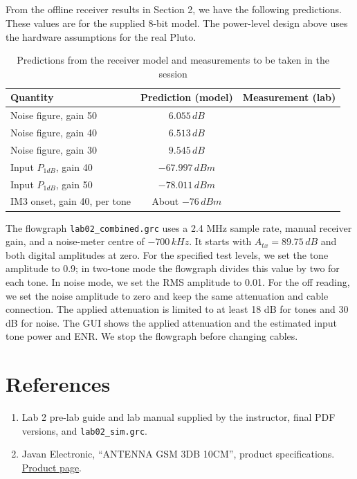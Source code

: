 \documentclass[]{article}
\begin{document}
    \subsection{}
    From the offline receiver results in Section 2, we have the following predictions. These values are for the supplied 8-bit model. The power-level design above uses the hardware assumptions for the real Pluto.

    \begin{table}[H]
    \centering\small
    \renewcommand{\arraystretch}{1.3}
    \begin{tabularx}{\linewidth}{|X|c|c|}
    \hline
    Quantity & Prediction (model) & Measurement (lab) \\ \hline
    Noise figure, gain 50 & $6.055\,dB$ & \\ \hline
    Noise figure, gain 40 & $6.513\,dB$ & \\ \hline
    Noise figure, gain 30 & $9.545\,dB$ & \\ \hline
    Input $P_{1dB}$, gain 40 & $-67.997\,dBm$ & \\ \hline
    Input $P_{1dB}$, gain 50 & $-78.011\,dBm$ & \\ \hline
    IM3 onset, gain 40, per tone & About $-76\,dBm$ & \\ \hline
    \end{tabularx}
    \caption{Predictions from the receiver model and measurements to be taken in the session}
    \end{table}

    The flowgraph \texttt{lab02\_combined.grc} uses a 2.4 MHz sample rate, manual receiver gain, and a noise-meter centre of $-700\,kHz$. It starts with $A_{tx}=89.75\,dB$ and both digital amplitudes at zero. For the specified test levels, we set the tone amplitude to 0.9; in two-tone mode the flowgraph divides this value by two for each tone. In noise mode, we set the RMS amplitude to 0.01. For the off reading, we set the noise amplitude to zero and keep the same attenuation and cable connection. The applied attenuation is limited to at least 18 dB for tones and 30 dB for noise. The GUI shows the applied attenuation and the estimated input tone power and ENR. We stop the flowgraph before changing cables.

    \section*{References}
    \begin{enumerate}
    \item Lab 2 pre-lab guide and lab manual supplied by the instructor, final PDF versions, and \texttt{lab02\_sim.grc}.
    \item Javan Electronic, ``ANTENNA GSM 3DB 10CM'', product specifications.
    \href{https://www.javanelec.com/shop/product/13139/non-brand/antenna-gsm-3db-10cm/}{Product page}.
    \end{enumerate}
\end{document}
